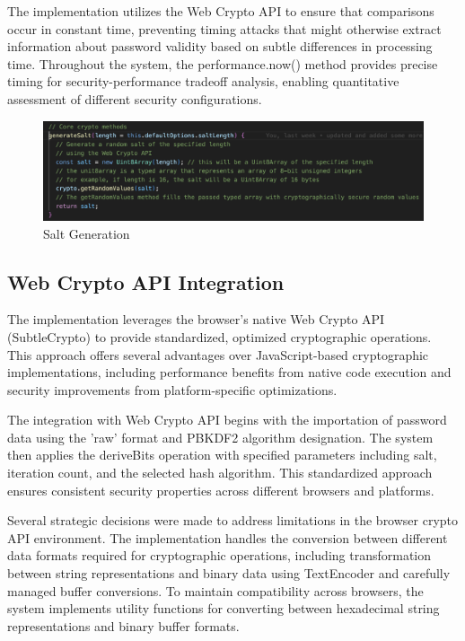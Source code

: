 \documentclass[11pt,a4paper]{article}
\begin{document}
The implementation utilizes the Web Crypto API to ensure that comparisons occur in constant time, preventing timing attacks that might otherwise extract information about password validity based on subtle differences in processing time. Throughout the system, the performance.now() method provides precise timing for security-performance tradeoff analysis, enabling quantitative assessment of different security configurations.
\begin{figure}[htbp]
  \centering
  \includegraphics[width=1\linewidth]{images/Salt.png}
  \caption{Salt Generation}
  \label{Salt}
\end{figure}
\subsection{Web Crypto API Integration}
The implementation leverages the browser's native Web Crypto API (SubtleCrypto) to provide standardized, optimized cryptographic operations. This approach offers several advantages over JavaScript-based cryptographic implementations, including performance benefits from native code execution and security improvements from platform-specific optimizations.

The integration with Web Crypto API begins with the importation of password data using the 'raw' format and PBKDF2 algorithm designation. The system then applies the deriveBits operation with specified parameters including salt, iteration count, and the selected hash algorithm. This standardized approach ensures consistent security properties across different browsers and platforms.

Several strategic decisions were made to address limitations in the browser crypto API environment. The implementation handles the conversion between different data formats required for cryptographic operations, including transformation between string representations and binary data using TextEncoder and carefully managed buffer conversions. To maintain compatibility across browsers, the system implements utility functions for converting between hexadecimal string representations and binary buffer formats.
\end{document}
